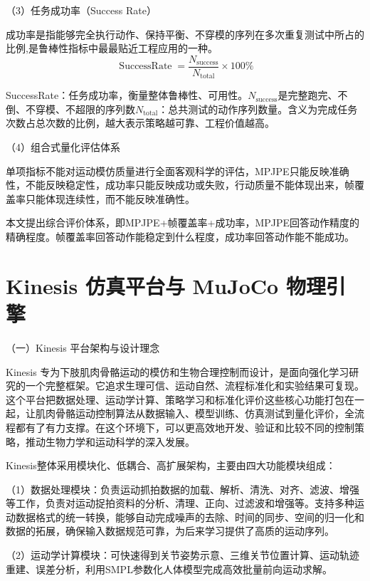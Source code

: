 （3）任务成功率（Success Rate）

成功率是指能够完全执行动作、保持平衡、不穿模的序列在多次重复测试中所占的比例,是鲁棒性指标中最最贴近工程应用的一种。
\begin{equation}
\operatorname{SuccessRate}=\frac{N_{\mathrm{success}}}{N_{\mathrm{total}}} \times 100\%
\tag{2-3}
\end{equation}

SuccessRate：任务成功率，衡量整体鲁棒性、可用性。\(N_{\mathrm{success}}\)是完整跑完、不倒、不穿模、不超限的序列数\(N_{\mathrm{total}}\)：总共测试的动作序列数量。含义为完成任务次数占总次数的比例，越大表示策略越可靠、工程价值越高。

（4）组合式量化评估体系

单项指标不能对运动模仿质量进行全面客观科学的评估，MPJPE只能反映准确性，不能反映稳定性，成功率只能反映成功或失败，行动质量不能体现出来，帧覆盖率只能体现连续性，而不能反映准确性。

本文提出综合评价体系，即MPJPE+帧覆盖率+成功率，MPJPE回答动作精度的精确程度。帧覆盖率回答动作能稳定到什么程度，成功率回答动作能不能成功。

\section{Kinesis 仿真平台与 MuJoCo 物理引擎}\label{kinesis-ux4effux771fux5e73ux53f0ux4e0e-mujoco-ux7269ux7406ux5f15ux64ce}

（一）Kinesis 平台架构与设计理念

Kinesis
专为下肢肌肉骨骼运动的模仿和生物合理控制而设计，是面向强化学习研究的一个完整框架。它追求生理可信、运动自然、流程标准化和实验结果可复现。这个平台把数据处理、运动学计算、策略学习和标准化评价这些核心功能打包在一起，让肌肉骨骼运动控制算法从数据输入、模型训练、仿真测试到量化评价，全流程都有了有力支撑。在这个环境下，可以更高效地开发、验证和比较不同的控制策略，推动生物力学和运动科学的深入发展。

Kinesis整体采用模块化、低耦合、高扩展架构，主要由四大功能模块组成：

（1）数据处理模块：负责运动抓拍数据的加载、解析、清洗、对齐、滤波、增强等工作，负责对运动捉拍资料的分析、清理、正向、过滤波和增强等。支持多种运动数据格式的统一转换，能够自动完成噪声的去除、时间的同步、空间的归一化和数据的拓展，确保输入数据规范可靠，为后来学习提供了高质的运动序列。

（2）运动学计算模块：可快速得到关节姿势示意、三维关节位置计算、运动轨迹重建、误差分析，利用SMPL参数化人体模型完成高效批量前向运动求解。

